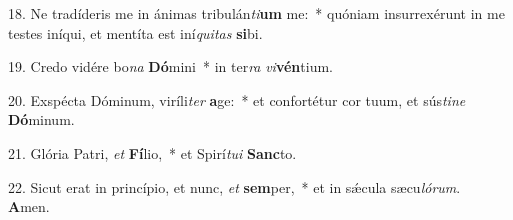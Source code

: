 18. Ne tradíderis me in ánimas tribulán\textit{ti}\textbf{um} me:~*  quóniam insurrexérunt in me testes iníqui, et mentíta est iní\textit{qui}\textit{tas} \textbf{si}bi.\

19. Credo vidére bo\textit{na} \textbf{Dó}mini~*  in ter\textit{ra} \textit{vi}\textbf{vén}tium.\

20. Exspécta Dóminum, viríli\textit{ter} \textbf{a}ge:~*  et confortétur cor tuum, et sús\textit{ti}\textit{ne} \textbf{Dó}minum.\

21. Glória Patri, \textit{et} \textbf{Fí}lio,~*  et Spirí\textit{tu}\textit{i} \textbf{Sanc}to.\

22. Sicut erat in princípio, et nunc, \textit{et} \textbf{sem}per,~*  et in sǽcula sæcu\textit{ló}\textit{rum}. \textbf{A}men.\

